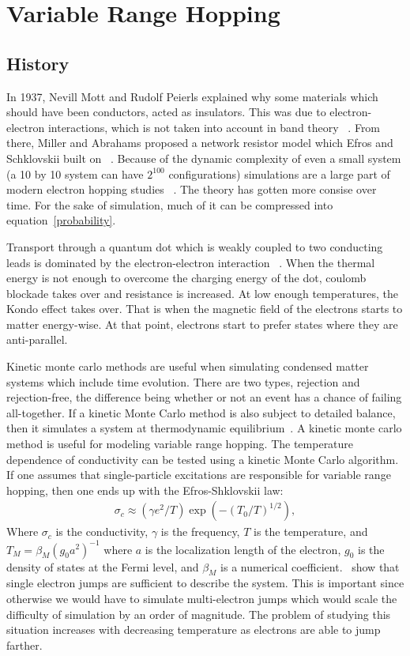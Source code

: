 \chapter{Variable Range Hopping}		%
\label{theorychap}

\section{History}
In 1937, Nevill Mott and Rudolf Peierls explained why some materials which should have been conductors, acted as insulators. This was due to electron-electron interactions, which is not taken into account in band theory ~\cite{mott72}. From there, Miller and Abrahams proposed a network resistor model which Efros and Schklovskii built on ~\cite{efros75}. Because of the dynamic complexity of even a small system (a 10 by 10 system can have $2^{100}$ configurations) simulations are a large part of modern electron hopping studies ~\cite{kirkengen09}. The theory has gotten more consise over time. For the sake of simulation, much of it can be compressed into equation~\ref{probability}.

Transport through a quantum dot which is weakly coupled to two conducting leads is dominated by the electron-electron interaction ~\cite{Glazman05}. When the thermal energy is not enough to overcome the charging energy of the dot, coulomb blockade takes over and resistance is increased. At low enough temperatures, the Kondo effect takes over. That is when the magnetic field of the electrons starts to matter energy-wise. At that point, electrons start to prefer states where they are anti-parallel.

Kinetic monte carlo methods are useful when simulating condensed matter systems which include time evolution. There are two types, rejection and rejection-free, the difference being whether or not an event has a chance of failing all-together. If a kinetic Monte Carlo method is also subject to detailed balance, then it simulates a system at thermodynamic equilibrium~\cite{Young66}. A kinetic monte carlo method is useful for modeling variable range hopping. The temperature dependence of conductivity can be tested using a kinetic Monte Carlo algorithm. If one assumes that single-particle excitations are responsible for variable range hopping, then one ends up with the Efros-Shklovskii law:
\begin{eqnarray}
\sigma_c \approx (\gamma e^2 / T) \exp(-(T_0/T)^{1/2}),
\label{ESlaw }
\end{eqnarray}
Where $\sigma_c$ is the conductivity, $\gamma$ is the frequency, $T$ is the temperature, and $T_M = \beta_M (g_0 a^2)^{-1}$ where $a$ is the localization length of the electron, $g_0$ is the density of states at the Fermi level, and $\beta_M$ is a numerical coefficient.~\cite{Tsigankov02} show that single electron jumps are sufficient to describe the system. This is important since otherwise we would have to simulate multi-electron jumps which would scale the difficulty of simulation by an order of magnitude. The problem of studying this situation increases with decreasing temperature as electrons are able to jump farther. 

